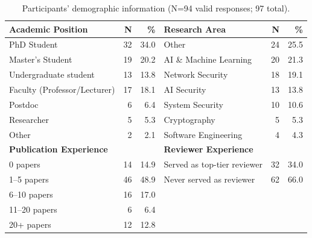 \begin{table}[t]
\centering
\caption{Participants' demographic information (N=94 valid responses; 97 total).}
\label{tab:demo_participants}
\small
\begin{tabular}{p{6cm}rr|p{6cm}rr}
\toprule
\textbf{Academic Position} & \textbf{N} & \textbf{\%} & \textbf{Research Area} & \textbf{N} & \textbf{\%} \\
\midrule
\rowcolor{tableRowLight}
PhD Student & 32 & 34.0 & Other & 24 & 25.5 \\
Master's Student & 19 & 20.2 & AI \& Machine Learning & 20 & 21.3 \\
\rowcolor{tableRowLight}
Undergraduate student & 13 & 13.8 & Network Security & 18 & 19.1 \\
Faculty (Professor/Lecturer) & 17 & 18.1 & AI Security & 13 & 13.8 \\
\rowcolor{tableRowLight}
Postdoc & 6 & 6.4 & System Security & 10 & 10.6 \\
Researcher & 5 & 5.3 & Cryptography & 5 & 5.3 \\
\rowcolor{tableRowLight}
Other & 2 & 2.1 & Software Engineering & 4 & 4.3 \\
\midrule
\textbf{Publication Experience} & & & \textbf{Reviewer Experience} & & \\
\midrule
\rowcolor{tableRowLight}
0 papers & 14 & 14.9 & Served as top-tier reviewer & 32 & 34.0 \\
1--5 papers & 46 & 48.9 & Never served as reviewer & 62 & 66.0 \\
\rowcolor{tableRowLight}
6--10 papers & 16 & 17.0 &  &  &  \\
11--20 papers & 6 & 6.4 &  &  &  \\
\rowcolor{tableRowLight}
20+ papers & 12 & 12.8 &  &  &  \\
\bottomrule
\end{tabular}
\end{table}

